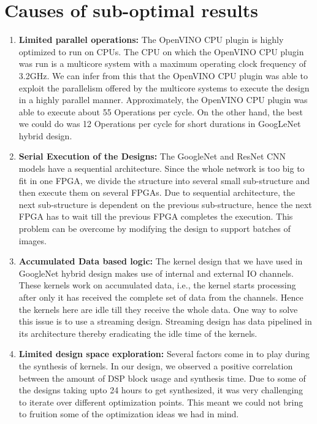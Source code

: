 \section{Causes of sub-optimal results} 
\label{sec:challenges}

\begin{enumerate}

\item\textbf{Limited parallel operations: } The OpenVINO CPU plugin is highly optimized to run on CPUs. The CPU on which the OpenVINO CPU plugin was run is a multicore system with a maximum operating clock frequency of 3.2GHz. We can infer from this that the OpenVINO CPU plugin was able to exploit the parallelism offered by the multicore systems to execute the design in a highly parallel manner. Approximately, the OpenVINO CPU plugin was able to execute about 55 Operations per cycle.
On the other hand, the best we could do was 12 Operations per cycle for short durations in GoogLeNet hybrid design.

\item\textbf{Serial Execution of the Designs: }
The GoogleNet and ResNet CNN models have a sequential architecture. Since the whole network is too big to fit in one FPGA, we divide the structure into several small sub-structure and then execute them on several FPGAs. Due to sequential architecture, the next sub-structure is dependent on the previous sub-structure, hence the next FPGA has to wait till the previous FPGA completes the execution. 
This problem can be overcome by modifying the design to support batches of images.


\item\textbf{Accumulated Data based logic: }
The kernel design that we have used in GoogleNet hybrid design makes use of internal and external IO channels. These kernels work on accumulated data, i.e., the kernel starts processing after only it has received the complete set of data from the channels. Hence the kernels here are idle till they receive the whole data. One way to solve this issue is to use a streaming design. Streaming design has data pipelined in its architecture thereby eradicating the idle time of the kernels.

\item\textbf{Limited design space exploration: }
Several factors come in to play during the synthesis of kernels. In our design, we observed a positive correlation between the amount of DSP block usage and synthesis time. Due to some of the designs taking upto 24 hours to get synthesized, it was very challenging to iterate over different optimization points. This meant we could not bring to fruition some of the optimization ideas we had in mind.


\end{enumerate}
